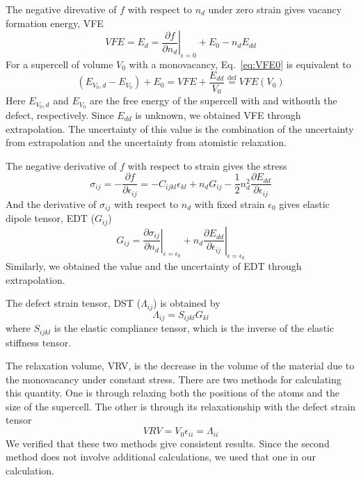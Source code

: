 \documentclass[%
 reprint,
 amsmath,amssymb,
 aps,
]{revtex4-1}
\begin{document}
The negative direvative of $f$ with respect to $n_d$ under zero strain gives vacancy formation energy, VFE
\begin{equation}
  \label{eq:VFE0}
  \mathit{VFE} = E_d = \left.\frac{\partial f}{\partial n_d}\right|_{\epsilon = 0} + E_{0} - n_d E_{dd}
\end{equation}
For a supercell of volume $V_0$ with a monovacancy, Eq.~\ref{eq:VFE0} is equivalent to
\begin{equation}
  (E_{V_0, d} - E_{V_0}) + E_{0} = \mathit{VFE} + \frac{E_{dd}}{V_0} \stackrel{\mathrm{def}}{=} \mathit{VFE}(V_0)
\end{equation}
Here $E_{V_0, d}$ and $E_{V_0}$ are the free energy of the supercell with and withouth the defect, respectively.
Since $E_{dd}$ is unknown, we obtained VFE through extrapolation.
The uncertainty of this value is the combination of the uncertainty from extrapolation and the uncertainty from atomistic relaxation.

The negative derivative of $f$ with respect to strain gives the stress
\begin{equation}
  \label{eq:stress}
  \sigma_{ij} = -\frac{\partial f}{\partial \epsilon_{ij}}
  = -C_{ijkl}\epsilon_{kl} + n_dG_{ij} - \frac{1}{2}n_d^2\frac{\partial E_{dd}}{\partial \epsilon_{ij}}
\end{equation}
And the derivative of $\sigma_{ij}$ with respect to $n_d$ with fixed strain $\epsilon_0$ gives elastic dipole tensor, EDT ($G_{ij}$)
\begin{equation}
  \label{eq:EDT}
  G_{ij} = \left.\frac{\partial \sigma_{ij}}{\partial n_d}\right|_{\epsilon = \epsilon_0}
  + n_d \left.\frac{\partial E_{dd}}{\partial \epsilon_{ij}}\right|_{\epsilon = \epsilon_0}
\end{equation}
Similarly, we obtained the value and the uncertainty of EDT through extrapolation.

The defect strain tensor, DST ($\Lambda_{ij}$) is obtained by
\begin{equation}
  \label{eq:DST}
  \Lambda_{ij} = S_{ijkl} G_{kl}
\end{equation}
where $S_{ijkl}$ is the elastic compliance tensor, which is the inverse of the elastic stiffness tensor.

The relaxation volume, VRV, is the decrease in the volume of the material due to the monovacancy under constant stress.
There are two methods for calculating this quantity.
One is through relaxing both the positions of the atoms and the size of the supercell.
The other is through its relaxationship with the defect strain tensor
\begin{equation}
  \label{eq:VRV}
  \mathit{VRV} = V_0\epsilon_{ii} = \Lambda_{ii}
\end{equation}
We verified that these two methods give consistent results.
Since the second method does not involve additional calculations, we used that one in our calculation.
\end{document}
